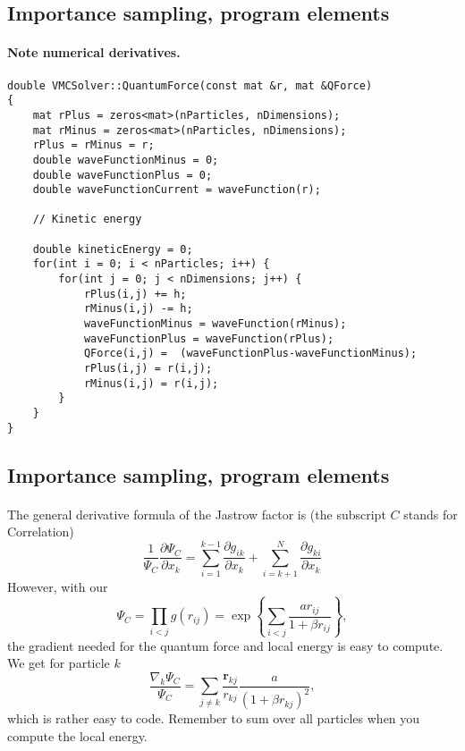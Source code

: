 \documentclass[%
twoside,                 %
final,                   %
10pt]{article}
\begin{document}
\subsection*{Importance sampling, program elements}

\paragraph{Note numerical derivatives.}
\begin{verbatim}
double VMCSolver::QuantumForce(const mat &r, mat &QForce)
{
    mat rPlus = zeros<mat>(nParticles, nDimensions);
    mat rMinus = zeros<mat>(nParticles, nDimensions);
    rPlus = rMinus = r;
    double waveFunctionMinus = 0;
    double waveFunctionPlus = 0;
    double waveFunctionCurrent = waveFunction(r);

    // Kinetic energy

    double kineticEnergy = 0;
    for(int i = 0; i < nParticles; i++) {
        for(int j = 0; j < nDimensions; j++) {
            rPlus(i,j) += h;
            rMinus(i,j) -= h;
            waveFunctionMinus = waveFunction(rMinus);
            waveFunctionPlus = waveFunction(rPlus);
            QForce(i,j) =  (waveFunctionPlus-waveFunctionMinus);
            rPlus(i,j) = r(i,j);
            rMinus(i,j) = r(i,j);
        }
    }
}
\end{verbatim}



\subsection*{Importance sampling, program elements}

\paragraph{}
The general derivative formula of the Jastrow factor is (the subscript $C$ stands for Correlation)
\[
\frac{1}{\Psi_C}\frac{\partial \Psi_C}{\partial x_k} =
\sum_{i=1}^{k-1}\frac{\partial g_{ik}}{\partial x_k}
+
\sum_{i=k+1}^{N}\frac{\partial g_{ki}}{\partial x_k}
\]
However, 
with our
\[
\Psi_C=\prod_{i< j}g(r_{ij})= \exp{\left\{\sum_{i<j}\frac{ar_{ij}}{1+\beta r_{ij}}\right\}},
\]
the gradient needed for the quantum force and local energy is easy to compute.  
We get for particle  $k$
\[
\frac{ \nabla_k \Psi_C}{ \Psi_C }= \sum_{j\ne k}\frac{\mathbf{r}_{kj}}{r_{kj}}\frac{a}{(1+\beta r_{kj})^2},
\]
which is rather easy to code.  Remember to sum over all particles  when you compute the local energy.
\end{document}
